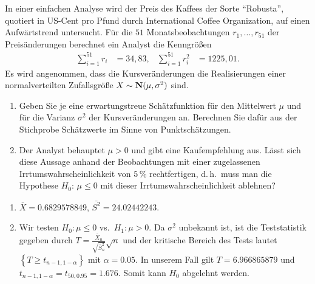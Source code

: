 In einer einfachen Analyse wird der
Preis des Kaffees der Sorte "`Robusta"', quotiert in US-Cent pro Pfund durch International
Coffee Organization, auf einen Aufwärtstrend untersucht. 
Für die $51$ Monatsbeobachtungen $r_{1},\dots ,r_{51}$ der Preisänderungen
berechnet ein Analyst die Kenngrößen
\begin{align*}
    \sum_{i=1}^{51} r_{i} &= 34,83, & \sum_{i=1}^{51} r^{2}_{i} &= 1225,01.
\end{align*}
Es wird angenommen, dass die Kursveränderungen die Realisierungen einer normalverteilten
Zufallsgröße $X\sim \mathbf N(\mu, \sigma^2)$ sind.
\begin{enumerate}
    \item Geben Sie je eine erwartungstreue Schätzfunktion für den Mittelwert
        $\mu$ und für die Varianz $\sigma^2$ der Kursveränderungen an.
        Berechnen Sie dafür aus der Stichprobe Schätzwerte im Sinne von
        Punktschätzungen.
    \item Der Analyst behauptet $\mu>0$ und gibt eine Kaufempfehlung aus. Lässt
        sich diese Aussage anhand der Beobachtungen mit einer zugelassenen
        Irrtumswahrscheinlichkeit von $5\,\%$ rechtfertigen, d.\,h.~muss man die
        Hypothese $H_0: \, \mu \le 0$ mit dieser Irrtums\-wahrscheinlichkeit
        ablehnen?
\end{enumerate}

\solution
\begin{enumerate}
    \item $\bar X = 0.6829578849$, $\bar{S^{2}} = 24.02442243$.
    \item Wir testen $H_0: \mu \leq 0$ vs.\ $H_1 : \mu > 0$. Da $\sigma^{2}$ unbekannt
        ist, ist die Teststatistik gegeben durch $T = \frac{\bar X_n}{ \sqrt{\bar S_n^2} } \sqrt{n}$
        und der kritische Bereich des Tests lautet $\left\{ T \geq t_{n-1, 1-\alpha} \right\}$
        mit $\alpha=0.05$. 
        In unserem Fall gilt $T = 6.966865879$ und $t_{n-1,1-\alpha}=
        t_{50,0.95} = 1.676$. Somit kann $H_0$ abgelehnt werden.
\end{enumerate}


